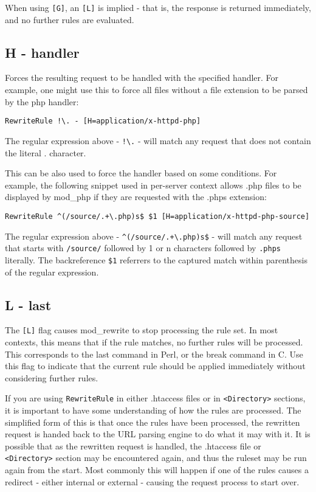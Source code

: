 When using \verb~[G]~, an \verb~[L]~ is implied - that is, the response is returned immediately, and no further rules are evaluated.

\subsection{H - handler}
\label{hflag}

Forces the resulting request to be handled with the specified handler. For example, one might use this to force all files without a file extension to be parsed by the php handler:

\begin{verbatim}
RewriteRule !\. - [H=application/x-httpd-php]
\end{verbatim}

The regular expression above - \verb~!\.~ - will match any request that does not contain the literal . character.

This can be also used to force the handler based on some conditions. For example, the following snippet used in per-server context allows .php files to be displayed by mod\_php if they are requested with the .phps extension:

\begin{verbatim}
RewriteRule ^(/source/.+\.php)s$ $1 [H=application/x-httpd-php-source]
\end{verbatim}

The regular expression above - \verb~^(/source/.+\.php)s$~ - will match any request that starts with \verb~/source/~ followed by 1 or n characters followed by \verb~.phps~ literally. The backreference \verb~$1~ referrers to the captured match within parenthesis of the regular expression.

\subsection{L - last}
\label{lflag}

The \verb~[L]~ flag causes mod\_rewrite to stop processing the rule set. In most contexts, this means that if the rule matches, no further rules will be processed. This corresponds to the last command in Perl, or the break command in C. Use this flag to indicate that the current rule should be applied immediately without considering further rules.

If you are using \verb~RewriteRule~ in either .htaccess files or in \verb~<Directory>~ sections, it is important to have some understanding of how the rules are processed. The simplified form of this is that once the rules have been processed, the rewritten request is handed back to the URL parsing engine to do what it may with it. It is possible that as the rewritten request is handled, the .htaccess file or \verb~<Directory>~ section may be encountered again, and thus the ruleset may be run again from the start. Most commonly this will happen if one of the rules causes a redirect - either internal or external - causing the request process to start over.

